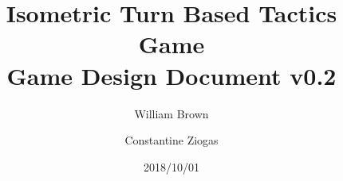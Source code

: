 \documentclass{article}
\title{Isometric Turn Based Tactics Game\\
       \large Game Design Document v0.2}
\author{William Brown \and Constantine Ziogas}
\date{2018/10/01}
\begin{document}
    \begin{titlepage}
        \maketitle
        \thispagestyle{empty}
    \end{titlepage}
    \newpage
    
    \tableofcontents
    \label{toc-contents}
    \newpage
    
    
    
    
    
    
    
    
    
    
    
    
\end{document}
